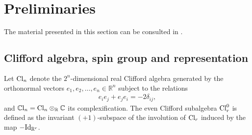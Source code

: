 \documentclass[10pt,a4paper]{amsart}
\numberwithin{equation}{section}
\begin{document}
\section{Preliminaries}\label{sec: preliminaries}

The material presented in this section can be consulted in \cite{Arizmendi-Garcia-Herrera, Brocker-tomDieck, Friedrich}.

\subsection{Clif\/ford algebra, spin group and representation}
Let ${\rm Cl}_n$ denote the $2^n$-dimensional real Clif\/ford algebra generated by the orthonormal vectors $e_1, e_2, \dots, e_n\in \mathbb{R}^n$ subject to
the relations
\begin{gather*}e_i e_j + e_j e_i = -2\delta_{ij},\end{gather*}
and $\mathbb{C}{\rm l}_n={\rm Cl}_n\otimes_{\mathbb{R}}\mathbb{C}$ its complexif\/ication. The even Clif\/ford subalgebra ${\rm Cl}_r^0$ is def\/ined as the invariant $(+1)$-subspace of the involution of ${\rm Cl}_r$ induced by the map $-{\rm Id}_{\mathbb{R}^r}$.
\end{document}
